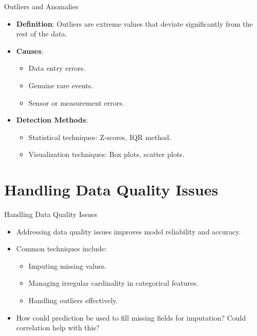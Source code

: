 \documentclass[aspectratio=169,xcolor=dvipsnames]{beamer}
\begin{document}
\begin{frame}{Outliers and Anomalies}
\begin{itemize}
    \setlength\itemsep{0.25cm}
    \item \textbf{Definition}: Outliers are extreme values that deviate significantly from the rest of the data.
    \item \textbf{Causes}:
    \begin{itemize}
        \item Data entry errors.
        \item Genuine rare events.
        \item Sensor or measurement errors.
    \end{itemize}
    \item \textbf{Detection Methods}:
    \begin{itemize}
        \item Statistical techniques: Z-scores, IQR method.
        \item Visualization techniques: Box plots, scatter plots.
    \end{itemize}
\end{itemize}
\end{frame}

\section{Handling Data Quality Issues}

\begin{frame}{Handling Data Quality Issues}
\begin{itemize}
    \setlength\itemsep{0.5cm}
    \item Addressing data quality issues improves model reliability and accuracy.
    \item Common techniques include:
    \begin{itemize}
        \item Imputing missing values.
        \item Managing irregular cardinality in categorical features.
        \item Handling outliers effectively.
    \end{itemize}
	\item How could prediction be used to fill missing fields for imputation? Could correlation help with this?
\end{itemize}
\end{frame}
\end{document}
